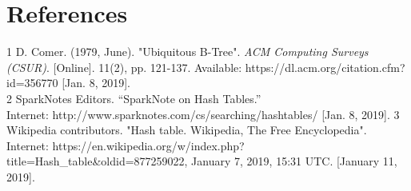 \section{References}

1 D. Comer. (1979, June). "Ubiquitous B-Tree". \textit{ACM Computing Surveys (CSUR)}. [Online]. 11(2), pp. 121-137. Available: https://dl.acm.org/citation.cfm?id=356770 [Jan. 8, 2019].\\
2 SparkNotes Editors. “SparkNote on Hash Tables.”\\Internet: http://www.sparknotes.com/cs/searching/hashtables/ [Jan. 8, 2019].
3 Wikipedia contributors. "Hash table. Wikipedia, The Free Encyclopedia". Internet: https://en.wikipedia.org/w/index.php?title=Hash\_table\&oldid=877259022, January 7, 2019, 15:31 UTC. [January 11, 2019]. 